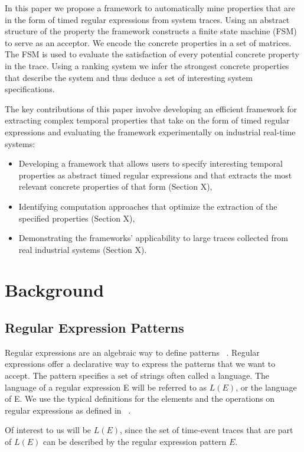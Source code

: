 \documentclass[]{sigplanconf}
\begin{document}
In this paper we propose a framework to automatically mine properties that are in the form of timed regular expressions from system traces. Using an abstract structure of the property the framework constructs a finite state machine (FSM) to serve as an acceptor. We encode the concrete properties in a set of matrices. The FSM is used to evaluate the satisfaction of every potential concrete property in the trace. Using a ranking system we infer the strongest concrete properties that describe the system and thus deduce a set of interesting system specifications.

The key contributions of this paper involve developing an efficient framework for extracting complex temporal properties that take on the form of timed regular expressions and evaluating the framework experimentally on industrial real-time systems:

\begin{itemize}
\item Developing a framework that allows users to specify interesting temporal properties as abstract timed regular expressions and that extracts the most relevant concrete properties of that form (Section X),
\item Identifying computation approaches that optimize the extraction of the specified properties (Section X),
\item Demonstrating the frameworks' applicability to large traces collected from real industrial systems  (Section X).
\end{itemize}

\section{Background}

\subsection{Regular Expression Patterns}
Regular expressions are an algebraic way to define patterns ~\cite{book2}. Regular expressions offer a declarative way to express the patterns that we want to accept. The pattern specifies a set of strings often called a language.  The language of a regular expression E will be referred to as $L(E)$, or the language of E. We use the typical definitions for the elements and the operations on regular expressions as defined in ~\cite{book1, book2}.

Of interest to us will be $L(E)$, since the set of time-event traces that are part of $L(E)$ can be described by the regular expression pattern $E$.
\end{document}
